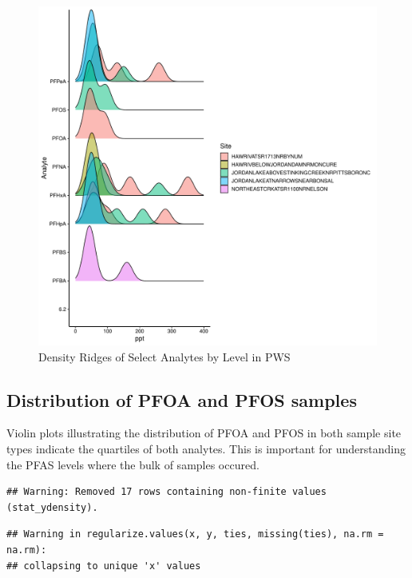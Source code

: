 \documentclass[
  12pt,
]{article}
\begin{document}
\begin{figure}

\includegraphics{PFAS_FinalProject_files/figure-latex/unnamed-chunk-7-1} \hfill{}

\caption{Density Ridges of Select Analytes by Level in PWS}\label{fig:unnamed-chunk-7}
\end{figure}

\hypertarget{distribution-of-pfoa-and-pfos-samples}{%
\subsection{Distribution of PFOA and PFOS
samples}\label{distribution-of-pfoa-and-pfos-samples}}

Violin plots illustrating the distribution of PFOA and PFOS in both
sample site types indicate the quartiles of both analytes. This is
important for understanding the PFAS levels where the bulk of samples
occured.

\begin{verbatim}
## Warning: Removed 17 rows containing non-finite values (stat_ydensity).
\end{verbatim}

\begin{verbatim}
## Warning in regularize.values(x, y, ties, missing(ties), na.rm = na.rm):
## collapsing to unique 'x' values
\end{verbatim}
\end{document}
